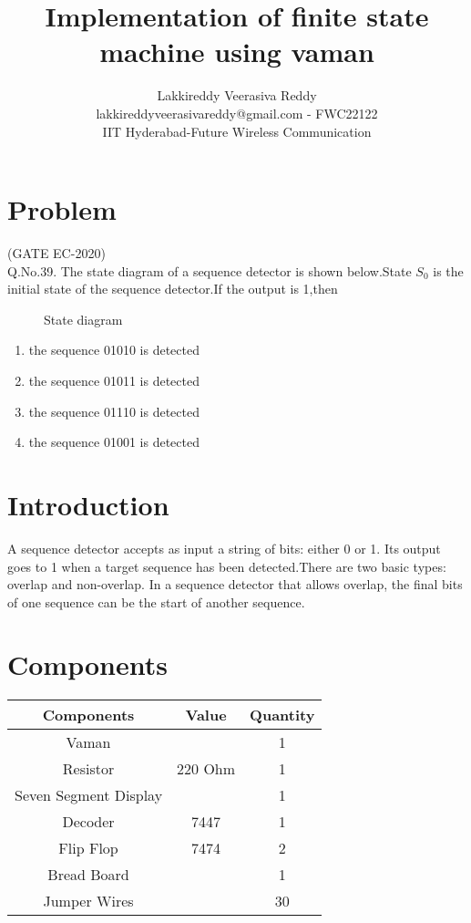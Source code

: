 \documentclass{article}
\title{Implementation of finite state machine using vaman}
\date{}
\author{Lakkireddy Veerasiva Reddy\\lakkireddyveerasivareddy@gmail.com - FWC22122\\IIT Hyderabad-Future Wireless Communication}
\begin{document}
\maketitle
\tableofcontents
	\pagebreak
\section{Problem}
	(GATE EC-2020)\\
	Q.No.39. The state diagram of a sequence detector is shown below.State $S_0$ is the initial state of the sequence detector.If the output is 1,then
 \begin{figure}[h]
  
  \caption{State diagram}
  \label{fig:1}		
  \end{figure}	 
\begin{enumerate}
 \item the sequence 01010 is detected
 \item the sequence 01011 is detected
 \item the sequence 01110 is detected
 \item the sequence 01001 is detected	 
\end{enumerate}	
\section{Introduction}
  A sequence detector accepts as input a string of bits: either 0 or 1. Its output goes to 1 when a target sequence has been detected.There are two basic types:  overlap  and  non-overlap. In a sequence detector that allows overlap, the final bits of one sequence can be  the start of another sequence.
	\section{Components}	
\begin{table}[h]
\centering

\begin{tabular}{|c|c|c|}
\hline
Components & Value & Quantity\\
\hline
Vaman & & 1\\
\hline
Resistor & 220 Ohm & 1\\
\hline
Seven Segment Display & & 1\\
\hline
Decoder & 7447 & 1\\
\hline
Flip Flop & 7474 & 2\\
\hline
Bread Board & & 1\\
\hline
Jumper Wires & & 30\\
\hline
\end{tabular}

\vspace{2mm}
\label{table:1}
\end{table}
\vspace{5mm}
\end{document}

